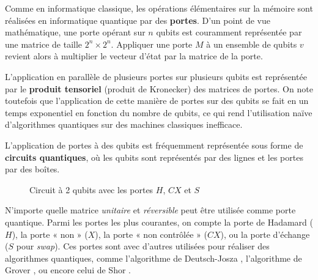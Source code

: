 \vspace{1em}

Comme en informatique classique, les opérations élémentaires sur la mémoire sont réalisées en informatique quantique par des \textbf{portes}. D'un point de vue mathématique, une porte opérant sur $n$ qubits est couramment représentée par une matrice de taille $2^n \times 2^n$. Appliquer une porte $M$ à un ensemble de qubits $v$ revient alors à multiplier le vecteur d'état par la matrice de la porte.

L'application en parallèle de plusieurs portes sur plusieurs qubits est représentée par le \textbf{produit tensoriel} (produit de Kronecker) des matrices de portes. On note toutefois que l'application de cette manière de portes sur des qubits se fait en un temps exponentiel en fonction du nombre de qubits, ce qui rend l'utilisation naïve d'algorithmes quantiques sur des machines classiques inefficace.

L'application de portes à des qubits est fréquemment représentée sous forme de \textbf{circuits quantiques}, où les qubits sont représentés par des lignes et les portes par des boîtes.

\begin{figure}
  \centering
  \caption{Circuit à 2 qubits avec les portes $H$, $CX$ et $S$}
\end{figure}

N'importe quelle matrice \textit{unitaire} et \textit{réversible} peut être utilisée comme porte quantique. Parmi les portes les plus courantes, on compte la porte de Hadamard ($H$), la porte « non » ($X$), la porte « non contrôlée » ($CX$), ou la porte d'échange ($S$ pour \textit{swap}). Ces portes sont avec d'autres utilisées pour réaliser des algorithmes quantiques, comme l'algorithme de Deutsch-Josza \cite{DJ_1992}, l'algorithme de Grover \cite{Grover_1996}, ou encore celui de Shor \cite{Shor_1997}.

